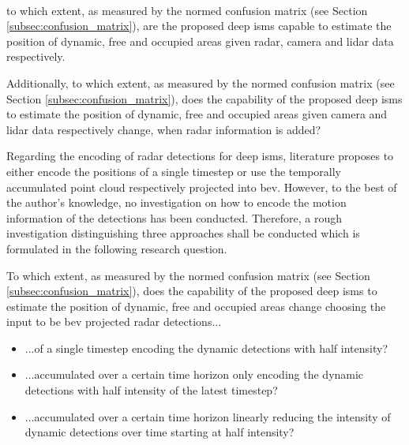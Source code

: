 \\
\begin{requ} \label{requ:comparison_of_isms}
	to which extent, as measured by the normed confusion matrix (see Section \ref{subsec:confusion_matrix}), are the proposed deep \gls{ism}s capable to estimate the position of dynamic, free and occupied areas given radar, camera and lidar data respectively.
\end{requ}
\vspace{\baselineskip}
\begin{requ} \label{requ:comparison_of_isms_fusion}
	Additionally, to which extent, as measured by the normed confusion matrix (see Section \ref{subsec:confusion_matrix}), does the capability of the proposed deep \gls{ism}s to estimate the position of dynamic, free and occupied areas given camera and lidar data respectively change, when radar information is added? 
\end{requ}
Regarding the encoding of radar detections for deep \gls{ism}s, literature proposes to either encode the positions of a single timestep or use the temporally accumulated point cloud respectively projected into \gls{bev}. However, to the best of the author's knowledge, no investigation on how to encode the motion information of the detections has been conducted. Therefore, a rough investigation distinguishing three approaches shall be conducted which is formulated in the following research question.
\\
\begin{requ} \label{requ:radar_dyn_encoding}
	To which extent, as measured by the normed confusion matrix (see Section \ref{subsec:confusion_matrix}), does the capability of the proposed deep \gls{ism}s to estimate the position of dynamic, free and occupied areas change choosing the input to be \gls{bev} projected radar detections...
	\begin{itemize}[noitemsep,nolistsep,topsep=0pt]
		\item ...of a single timestep encoding the dynamic detections with half intensity?
		\item ...accumulated over a certain time horizon only encoding the dynamic detections with half intensity of the latest timestep?
		\item ...accumulated over a certain time horizon linearly reducing the intensity of dynamic detections over time starting at half intensity?
	\end{itemize} 
\end{requ}
